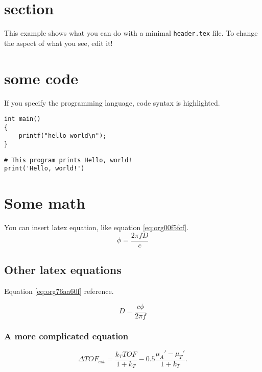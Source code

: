 


\maketitle

\newpage

\section{section}
\label{sec:orga1d5697}
This example shows what you can do with a minimal \texttt{header.tex} file.
To change the aspect of what you see, edit it!

\section{some code}
\label{sec:org12416ba}
If you specify the programming language, code syntax is highlighted.
\begin{verbatim}
int main()
{
    printf("hello world\n");
}
\end{verbatim}

\begin{verbatim}
# This program prints Hello, world!
print('Hello, world!')
\end{verbatim}

\section{Some math}
\label{sec:orgb613f15}
You can insert latex equation, like equation \ref{eq:org00f5fcf}.
\begin{equation}
\label{eq:org00f5fcf}
\phi = \frac{2\pi fD}{c}
\end{equation}
\subsection{Other latex equations}
\label{sec:org14c4667}
Equation \ref{eq:org76aa60f} reference.

\begin{equation}
\label{eq:org76aa60f}
D = \frac{c\phi}{2\pi f}
\end{equation}

\subsubsection{A more complicated equation}
\label{sec:org45e768f}

\begin{equation}
\Delta TOF_{est} = \frac{k_T TOF}{1+k_T } - 0.5 \frac{\mu_A' - \mu_T'}{1+k_T}.
\end{equation}

